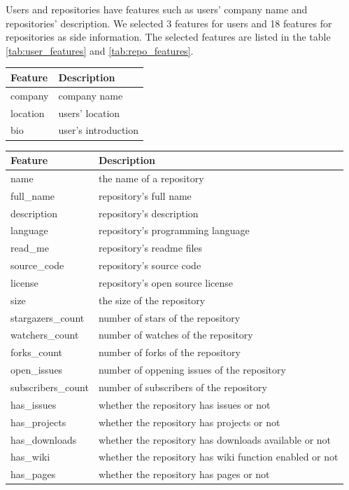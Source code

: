 \documentclass[11pt,twoside]{report}
\begin{document}
Users and repositories have features such as users' company name and repositories' description. We selected 3 features for users and 18 features for repositories as side information. The selected features are listed in the table \ref{tab:user_features} and \ref{tab:repo_features}.

\begin{center}
    \begin{tabular}{l | l}
    \hline
    Feature & Description \\
    \hline
    company & company name \\
    location & users' location \\
    bio & user's introduction \\
    \end{tabular}
    \label{tab:user_features}
\end{center}

\begin{center}
    \begin{tabular}{l | l}
    \hline
    Feature & Description \\
    \hline
    name & the name of a repository \\
    full\_name & repository's full name \\
    description & repository's description \\
    language & repository's programming language \\
    read\_me & repository's readme files \\
    source\_code & repository's source code \\
    license & repository's open source license \\
    size & the size of the repository \\
    stargazers\_count & number of stars of the repository \\
    watchers\_count & number of watches of the repository \\
    forks\_count & number of forks of the repository \\
    open\_issues & number of oppening issues of the repository \\
    subscribers\_count & number of subscribers of the repository \\
    has\_issues & whether the repository has issues or not \\
    has\_projects & whether the repository has projects or not \\
    has\_downloads & whether the repository has downloads available or not \\
    has\_wiki & whether the repository has wiki function enabled or not \\
    has\_pages & whether the repository has pages or not \\
    \end{tabular}
    \label{tab:repo_features}
\end{center}
\end{document}
